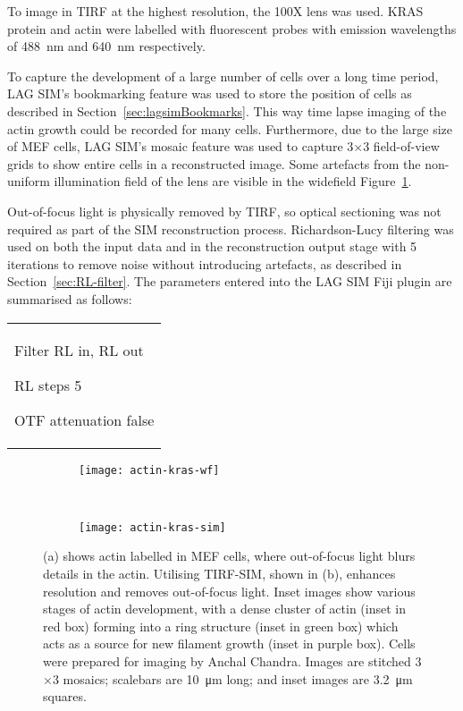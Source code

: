 To image in TIRF at the highest resolution, the 100X  lens was used.
KRAS protein and actin were labelled with fluorescent probes with emission wavelengths of \SI{488}{\nano\metre} and \SI{640}{\nano\metre} respectively.

To capture the development of a large number of cells over a long time period, LAG SIM's bookmarking feature was used to store the position of cells as described in Section~\ref{sec:lagsimBookmarks}.
This way time lapse imaging of the actin growth could be recorded for many cells.
Furthermore, due to the large size of MEF cells, LAG SIM's mosaic feature was used to capture 3$\times$3 field-of-view grids to show entire cells in a reconstructed image.
Some artefacts from the non-uniform illumination field of the lens are visible in the widefield Figure~\ref{fig:widefield-actin}. 

Out-of-focus light is physically removed by TIRF, so optical sectioning was not required as part of the SIM reconstruction process.
Richardson-Lucy filtering was used on both the input data and in the reconstruction output stage with 5 iterations to remove noise without introducing artefacts, as described in Section~\ref{sec:RL-filter}.
The parameters entered into the LAG SIM Fiji plugin are summarised as follows: \newline
\begin{tabular}{p{}}
\begin{labelling}[margin=OTF attenuation]
	\item[Filter] RL in, RL out
	\item[RL steps] 5
	\item[OTF attenuation] false
\end{labelling}
\end{tabular}

\begin{figure}[tbp!]
\centering
\begin{subfigure}[b]{0.82\textwidth}
	\texttt{[image: actin-kras-wf]}
	\caption{}\label{fig:widefield-actin}
\end{subfigure}

~\newline
\begin{subfigure}[b]{0.82\textwidth}
	\texttt{[image: actin-kras-sim]}
	\caption{}\label{fig:recon-tirf-actin}
\end{subfigure}
\caption[LAG SIM: TIRF-SIM imaging of actin in MEF cells removes out-of-focus light allowing actin development to be studied]{(a) shows actin labelled in MEF cells, where out-of-focus light blurs details in the actin. Utilising TIRF-SIM, shown in (b), enhances resolution and removes out-of-focus light. Inset images show various stages of actin development, with a dense cluster of actin (inset in red box) forming into a ring structure (inset in green box) which acts as a source for new filament growth (inset in purple box). Cells were prepared for imaging by Anchal Chandra. Images are stitched 3$\times$3 mosaics; scalebars are \SI{10}{\micro\metre} long; and inset images are \SI{3.2}{\micro\metre} squares.}
\label{fig:recon-actin}
\end{figure}
\afterpage{\clearpage}

